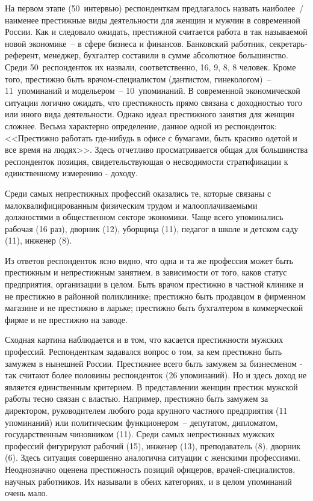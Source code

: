   На первом этапе (50~интервью) респонденткам предлагалось назвать наиболее~/
  наименее престижные виды деятельности для женщин и мужчин в современной
  России. Как и следовало ожидать, престижной считается работа в так называемой
  новой экономике~-- в сфере бизнеса и финансов. Банковский работник,
  секретарь-референт, менеджер, бухгалтер составили в сумме абсолютное
  большинство. Среди 50~респонденток их назвали, соответственно, 16, 9, 8, 8
  человек. Кроме того, престижно быть врачом-специалистом (дантистом,
  гинекологом)~-- 11~упоминаний и модельером~-- 10~упоминаний. В современной
  экономической ситуации логично ожидать, что престижность прямо связана с
  доходностью того или иного вида деятельности. Однако идеал престижного занятия
  для женщин сложнее. Весьма характерно определение, данное одной из
  респонденток: <<Престижно работать где-нибудь в офисе с бумагами, быть красиво
  одетой и все время на людях>>. Здесь отчетливо просматривается общая для
  большинства респонденток позиция, свидетельствующая о несводимости
  стратификации к единственному измерению - доходу.
  
  Среди самых непрестижных профессий оказались те, которые связаны с
  малоквалифицированным физическим трудом и малооплачиваемыми должностями в
  общественном секторе экономики. Чаще всего упоминались рабочая (16 раз),
  дворник (12), уборщица (11), педагог в школе и детском саду (11), инженер (8).
  
  Из ответов респонденток ясно видно, что одна и та же профессия может быть
  престижным и непрестижным занятием, в зависимости от того, каков статус
  предприятия, организации в целом. Быть врачом престижно в частной клинике и не
  престижно в районной поликлинике; престижно быть продавцом в фирменном
  магазине и не престижно в ларьке; престижно быть бухгалтером в коммерческой
  фирме и не престижно на заводе.
  
  Сходная картина наблюдается и в том, что касается престижности мужских
  профессий. Респонденткам задавался вопрос о том, за кем престижно быть замужем
  в нынешней России. Престижнее всего быть замужем за бизнесменом - так считают
  более половины респонденток (26 упоминаний). Но и здесь доход не является
  единственным критерием. В представлении женщин престиж мужской работы тесно
  связан с властью. Например, престижно быть замужем за директором,
  руководителем любого рода крупного частного предприятия (11 упоминаний) или
  политическим функционером~-- депутатом, дипломатом, государственным чиновником
  (11). Среди самых непрестижных мужских профессий фигурируют рабочий (15),
  инженер (13), преподаватель (8), дворник (6). Здесь ситуация совершенно
  аналогична ситуации с женскими профессиями. Неоднозначно оценена престижность
  позиций офицеров, врачей-специалистов, научных работников. Их называли в обеих
  категориях, и в целом упоминаний очень мало.
  
